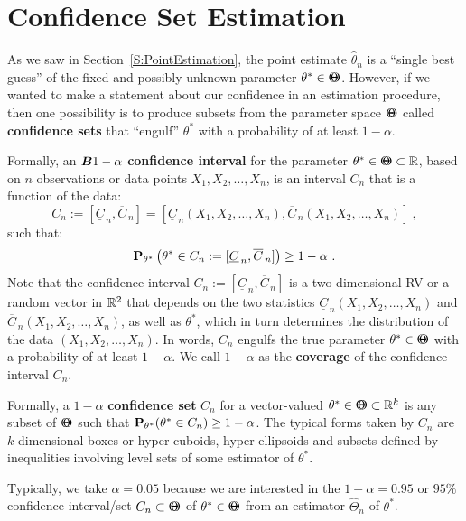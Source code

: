 \section{Confidence Set Estimation}\label{S:ConfidenceSets}
As we saw in Section~\ref*{S:PointEstimation}, the point estimate $\widehat{\theta}_n$ is a ``single best guess'' of  the fixed and possibly unknown parameter $\theta^* \in {\Theta}\mspace{-11 mu}{\Theta}$.  However, if we wanted to make a statement about our confidence in an estimation procedure, then one possibility is to produce subsets from the parameter space ${\Theta}\mspace{-11 mu}{\Theta}$ called {\bf confidence sets} that ``engulf'' $\theta^*$ with a probability of at least $1-\alpha$.  

Formally, an $\B{1-\alpha}$ {\bf confidence interval} for the parameter $\theta^* \in {\Theta}\mspace{-11 mu}{\Theta} \subset \mathbb{R}$, based on $n$ observations or data points $X_1,X_2,\ldots,X_n$, is an interval $C_n$ that is a function of the data:
\[
C_n := [\underline{C}_{\, n}, \overline{C}_{\, n}]
= [\underline{C}_{\, n}(X_1,X_2,\ldots,X_n), \overline{C}_{\, n}(X_1,X_2,\ldots,X_n)] \ ,
\]
such that:
\[
\mathbf{P}_{\theta^*} \left(  \theta^* \in C_n :=  [\underline{C}_{\, n}, \overline{C}_{\, n}] \right) \geq 1-\alpha \ .
\]
Note that the confidence interval $C_n := [\underline{C}_{\, n}, \overline{C}_{\, n}]$ is a two-dimensional RV or a random vector in $\mathbb{R}^2$ that depends on the two statistics $\underline{C}_{\, n} (X_1,X_2,\ldots,X_n) $ and $\overline{C}_{\, n} (X_1,X_2,\ldots,X_n) $, as well as $\theta^*$, which in turn determines the distribution of the data $(X_1,X_2,\ldots,X_n)$.  In words, $C_n$ engulfs the true parameter $\theta^* \in {\Theta}\mspace{-11 mu}{\Theta}$ with a probability of at least $1-\alpha$.  We call $1-\alpha$ as the {\bf coverage} of the confidence interval $C_n$.

Formally, a $1-\alpha$ {\bf confidence set} $C_n$ for a vector-valued $\theta^* \in {\Theta}\mspace{-11 mu}{\Theta} \subset \mathbb{R}^k$ is any subset of ${\Theta}\mspace{-11 mu}{\Theta}$ such that $\mathbf{P}_{\theta^*}( \theta^* \in C_n) \geq 1-\alpha$.  The typical forms taken by $C_n$ are $k$-dimensional boxes or hyper-cuboids, hyper-ellipsoids and subsets defined by inequalities involving level sets of some estimator of $\theta^*$.  

Typically, we take $\alpha=0.05$ because we are interested in the $1-\alpha=0.95$ or $95\%$ confidence interval/set $C_n \subset {\Theta}\mspace{-11 mu}{\Theta}$ of $\theta^* \in {\Theta}\mspace{-11 mu}{\Theta}$ from an estimator $\widehat{\Theta}_n$ of $\theta^*$.  


